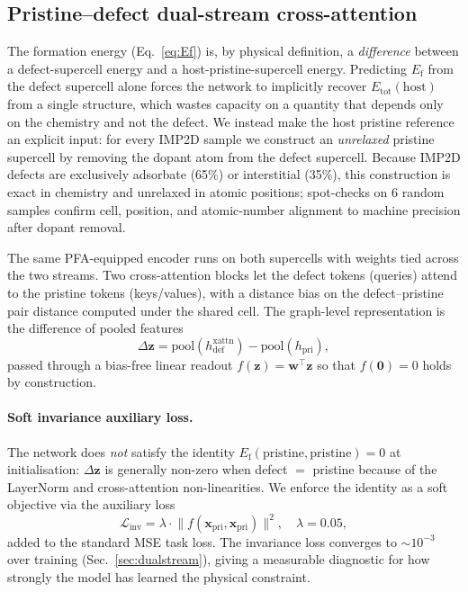 \documentclass[11pt,a4paper]{article}
\begin{document}
\subsection{Pristine--defect dual-stream cross-attention}\label{sec:arch:ds}
The formation energy (Eq.~\ref{eq:Ef}) is, by physical definition, a
\emph{difference} between a defect-supercell energy and a
host-pristine-supercell energy. Predicting $E_{\mathrm{f}}$ from the
defect supercell alone forces the network to implicitly recover
$E_{\mathrm{tot}}(\mathrm{host})$ from a single structure, which
wastes capacity on a quantity that depends only on the chemistry
and not the defect. We instead make the host pristine reference an
explicit input: for every IMP2D sample we construct an
\emph{unrelaxed} pristine supercell by removing the dopant atom from
the defect supercell. Because IMP2D defects are exclusively
adsorbate (65\%) or interstitial (35\%), this construction is exact
in chemistry and unrelaxed in atomic positions; spot-checks on
6 random samples confirm cell, position, and atomic-number alignment
to machine precision after dopant removal.

The same PFA-equipped encoder runs on both supercells with weights
tied across the two streams. Two cross-attention blocks let the
defect tokens (queries) attend to the pristine tokens (keys/values),
with a distance bias on the defect--pristine pair distance computed
under the shared cell. The graph-level representation is the
difference of pooled features
\begin{equation}
\Delta\mathbf{z} = \mathrm{pool}(h^{\mathrm{xattn}}_{\mathrm{def}})
- \mathrm{pool}(h_{\mathrm{pri}}),
\label{eq:deltaz}
\end{equation}
passed through a bias-free linear readout
$f(\mathbf{z}) = \mathbf{w}^\top \mathbf{z}$ so that
$f(\mathbf{0}) = 0$ holds by construction.

\paragraph{Soft invariance auxiliary loss.}
The network does \emph{not} satisfy the identity
$E_{\mathrm{f}}(\mathrm{pristine}, \mathrm{pristine}) = 0$ at
initialisation: $\Delta\mathbf{z}$ is generally non-zero when
defect $=$ pristine because of the LayerNorm and cross-attention
non-linearities. We enforce the identity as a soft objective via
the auxiliary loss
\begin{equation}
\mathcal{L}_{\mathrm{inv}} = \lambda \cdot
\bigl\| f(\mathbf{x}_{\mathrm{pri}}, \mathbf{x}_{\mathrm{pri}}) \bigr\|^2,
\quad \lambda = 0.05,
\label{eq:Linv}
\end{equation}
added to the standard MSE task loss. The invariance loss converges
to $\sim 10^{-3}$ over training (Sec.~\ref{sec:dualstream}), giving
a measurable diagnostic for how strongly the model has learned the
physical constraint.
\end{document}

